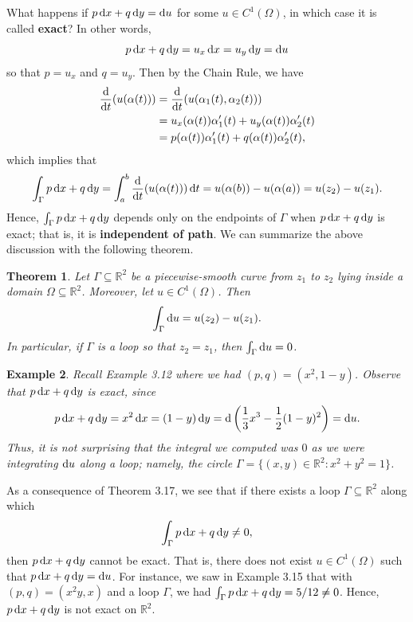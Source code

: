 \documentclass[10pt]{article}
\newcommand{\R}{\mathbb{R}}
\theoremstyle{newstyle}
\newtheorem{thm}{Theorem}[section]
\newtheorem{exmp}[thm]{Example}
\begin{document}
What happens if $p\,{\rm d}x + q\,{\rm d}y = {\rm d}u$ for some $u \in C^1(\Omega)$, 
in which case it is called {\bf exact}? In other words, 
\[ p\,{\rm d}x + q\,{\rm d}y = u_x\,{\rm d}x = u_y\,{\rm d}y = {\rm d}u \]
so that $p = u_x$ and $q = u_y$. Then by the Chain Rule, we have 
\begin{align*}
    \frac{{\rm d}}{{\rm d}t} (u(\alpha(t))) 
    &= \frac{\rm d}{{\rm d}t} (u(\alpha_1(t), \alpha_2(t))) \\
    &= u_x(\alpha(t)) \alpha'_1(t) + u_y(\alpha(t)) \alpha'_2(t) \\
    &= p(\alpha(t))\alpha'_1(t) + q(\alpha(t)) \alpha'_2(t),
\end{align*}
which implies that 
\[ \int_\Gamma p\,{\rm d}x + q\,{\rm d}y = \int_a^b \frac{\rm d}{{\rm d}t} (u(\alpha(t)))\,{\rm d}t 
= u(\alpha(b)) - u(\alpha(a)) = u(z_2) - u(z_1). \]
Hence, $\int_\Gamma p\,{\rm d}x + q\,{\rm d}y$ depends only on the endpoints of $\Gamma$
when $p\,{\rm d}x + q\,{\rm d}y$ is exact; that is, it is {\bf independent of path}.
We can summarize the above discussion with the following theorem.

\begin{thm}
Let $\Gamma \subseteq \R^2$ be a piecewise-smooth curve from $z_1$ to $z_2$ lying inside a domain 
$\Omega \subseteq \R^2$. Moreover, let $u \in C^1(\Omega)$. Then 
\[ \int_\Gamma {\rm d}u = u(z_2) - u(z_1). \]
In particular, if $\Gamma$ is a loop so that $z_2 = z_1$, then $\int_\Gamma {\rm d}u = 0$.
\end{thm}

\begin{exmp}
Recall Example 3.12 where we had $(p, q) = (x^2, 1-y)$. Observe that $p\,{\rm d}x + q\,{\rm d}y$ is 
exact, since 
\[ p\,{\rm d}x + q\,{\rm d}y = x^2\,{\rm d}x = (1-y)\,{\rm d}y = {\rm d}\left(\frac13x^3 - \frac12(1-y)^2
\right) = {\rm d}u. \]
Thus, it is not surprising that the integral we computed was $0$ as we were integrating 
${\rm d}u$ along a loop; namely, the circle $\Gamma = \{(x, y) \in \R^2 : x^2+y^2=1\}$.
\end{exmp}

As a consequence of Theorem 3.17, we see that if there exists a loop $\Gamma \subseteq \R^2$ 
along which 
\[ \int_\Gamma p\,{\rm d}x + q\,{\rm d}y \neq 0, \]
then $p\,{\rm d}x + q\,{\rm d}y$ cannot be exact. That is, there does not exist 
$u \in C^1(\Omega)$ such that $p\,{\rm d}x + q\,{\rm d}y = {\rm d}u$. For instance, we 
saw in Example 3.15 that with $(p, q) = (x^2 y, x)$ and a loop $\Gamma$, 
we had $\int_\Gamma p\,{\rm d}x + q\,{\rm d}y = 5/12 \neq 0$. Hence, 
$p\,{\rm d}x + q\,{\rm d}y$ is not exact on $\R^2$.
\end{document}
